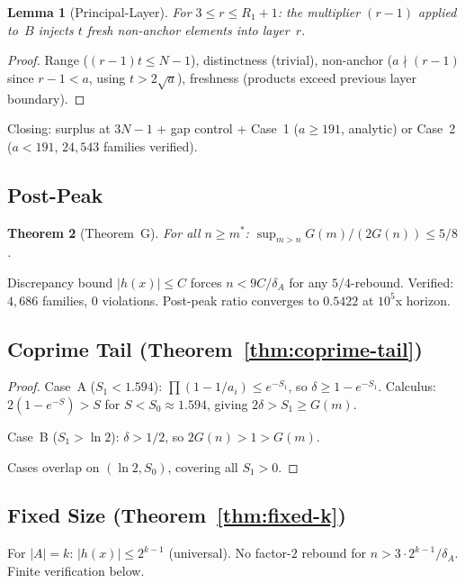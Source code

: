 \documentclass[11pt,a4paper]{article}
\newtheorem{theorem}{Theorem}[section]
\newtheorem{lemma}[theorem]{Lemma}
\theoremstyle{definition}
\begin{document}
\begin{lemma}[Principal-Layer]\label{lem:principal}
For $3 \leq r \leq R_1{+}1$: the multiplier $(r{-}1)$ applied to~$B$
injects $t$ fresh non-anchor elements into layer~$r$.
\end{lemma}

\begin{proof}
Range ($(r{-}1)t \leq N{-}1$), distinctness (trivial), non-anchor
($a \nmid (r{-}1)$ since $r{-}1 < a$, using $t > 2\sqrt{a}$),
freshness (products exceed previous layer boundary).
\end{proof}

Closing: surplus at $3N{-}1$ + gap control + Case~1 ($a \geq 191$,
analytic) or Case~2 ($a < 191$, $24{,}543$ families verified).

\subsection{Post-Peak}

\begin{theorem}[Theorem~G]\label{thm:postpeak}
For all $n \geq m^*$: $\sup_{m>n} G(m)/(2G(n)) \leq 5/8$.
\end{theorem}

Discrepancy bound $|h(x)| \leq C$ forces $n < 9C/\delta_A$ for any
$5/4$-rebound. Verified: $4{,}686$ families, $0$ violations. Post-peak
ratio converges to $0.5422$ at $10^5$x horizon.

\subsection{Coprime Tail (Theorem~\ref{thm:coprime-tail})}

\begin{proof}
Case~A ($S_1 < 1.594$): $\prod(1{-}1/a_i) \leq e^{-S_1}$, so
$\delta \geq 1 - e^{-S_1}$. Calculus: $2(1{-}e^{-S}) > S$ for
$S < S_0 \approx 1.594$, giving $2\delta > S_1 \geq G(m)$.

Case~B ($S_1 > \ln 2$): $\delta > 1/2$, so $2G(n) > 1 > G(m)$.

Cases overlap on $(\ln 2, S_0)$, covering all $S_1 > 0$.
\end{proof}

\subsection{Fixed Size (Theorem~\ref{thm:fixed-k})}

For $|A| = k$: $|h(x)| \leq 2^{k-1}$ (universal). No factor-$2$
rebound for $n > 3 \cdot 2^{k-1}/\delta_A$. Finite verification below.
\end{document}
